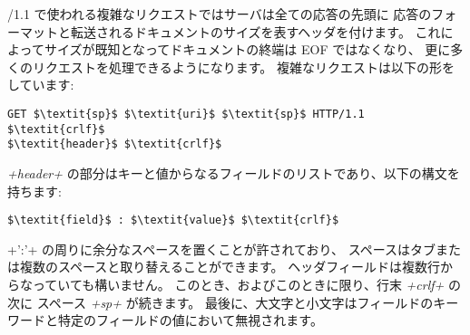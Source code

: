 \http/1.1 で使われる複雑なリクエストではサーバは全ての応答の先頭に
応答のフォーマットと転送されるドキュメントのサイズを表すヘッダを付けます。
これによってサイズが既知となってドキュメントの終端は EOF ではなくなり、
更に多くのリクエストを処理できるようになります。
複雑なリクエストは以下の形をしています:
%
\begin{lstlisting}
GET $\textit{sp}$ $\textit{uri}$ $\textit{sp}$ HTTP/1.1 $\textit{crlf}$
$\textit{header}$ $\textit{crlf}$
\end{lstlisting}
%
\textit{\ml+header+} の部分はキーと値からなるフィールドのリストであり、以下の構文を持ちます:
%
\begin{lstlisting}
$\textit{field}$ : $\textit{value}$ $\textit{crlf}$
\end{lstlisting}
%
\ml+':'+ の周りに余分なスペースを置くことが許されており、
スペースはタブまたは複数のスペースと取り替えることができます。
ヘッダフィールドは複数行からなっていても構いません。
このとき、およびこのときに限り、行末 \textit {\ml+crlf+} の次に
スペース \textit{\ml+sp+} が続きます。
最後に、大文字と小文字はフィールドのキーワードと特定のフィールドの値において無視されます。

